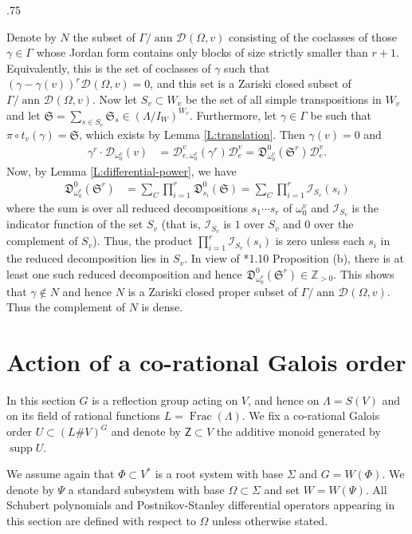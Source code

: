 \documentclass[11pt,fleqn]{amsart}
\makeatletter
\renewcommand\proofname{Proof}
\renewenvironment{proof}[1][\textit{\proofname}]{\par
 \pushQED{\qed}%
 \normalfont \topsep.75\paraskip\relax
 \trivlist
 \item[\hskip\labelsep
 \itshape
 #1\@addpunct{.}]\ignorespaces
}{%
 \popQED\endtrivlist\@endpefalse
}
\newcounter{para}[section]
\newcommand\ZZ{\mathbb Z}
\newcommand\D[3]{{}^{#1} \mathfrak D_{#2}^{#3}}
\newcommand\DD[3]{{}^{#1} \mathcal D_{#2}^{#3}}
\newcommand\Z{\mathsf Z}
\renewcommand\SS{\mathfrak S}
\DeclareMathOperator\Frac{Frac}
\DeclareMathOperator\ann{ann}
\DeclareMathOperator\supp{supp}
\makeatother
\begin{document}
\begin{proof}
Denote by $N$ the subset of $\Gamma /\ann \DD{}{}{}(\Omega, v)$ consisting of
the coclasses of those $\gamma \in \Gamma$ whose Jordan form contains only 
blocks of size strictly smaller than $r + 1$. Equivalently, 
this is the set of coclasses of $\gamma$ such that $(\gamma - 
\gamma(v))^{r} \DD{}{}{}(\Omega, v) = 0$, and this set is a 
Zariski closed subset of $\Gamma / \ann \DD{}{}{}(\Omega, v)$. Now let $S_v \subset 
W_v$ be the set of all simple transpositions in $W_v$ and let $\SS = 
\sum_{s \in S_v} \SS_s \in (\Lambda/I_W)^{W_v}$. Furthermore, let $\gamma \in \Gamma$
be such that $\pi \circ t_v(\gamma) = \SS$, which exists by Lemma 
\ref{L:translation}. Then $\gamma(v) = 0$ and
\begin{align*}
\gamma^{r} \cdot \DD{}{\omega_0^v}{}(v)
	&= \DD{}{e,\omega_0^v}{v}(\gamma^{r}) \DD{}{e}{v}
	= \D{}{\omega_0^v}{0}(\SS^{r}) \DD{}{e}{v}.
\end{align*}
Now, by Lemma \ref{L:differential-power}, we have 
\begin{align*}
\D{}{\omega_0^v}{0}(\SS^{r})
	&= \sum_{C} \prod_{i=1}^{r} \D{}{s_i}{0}(\SS)
	= \sum_{C} \prod_{i=1}^{r} \mathcal I_{S_v}(s_i)
\end{align*}
where the sum is over all reduced decompositions $s_1 \cdots s_{r}$ of 
$\omega_0^v$ and $\mathcal I_{S_v}$ is the indicator function of the set $S_v$ 
(that is, $\mathcal I_{S_v}$ is $1$ over $S_v$ and $0$ over the complement of 
$S_v$). Thus, the product $\prod_{i=1}^{r} \mathcal I_{S_v}(s_i)$ is zero 
unless each $s_i$ in the reduced decomposition lies in $S_v$. In view of 
\cite{Hump-coxeter-book}*{1.10 Proposition (b)}, there is at least one
such reduced decomposition and hence $\D{}{\omega_0^v}{0}(\SS^{r}) \in 
\ZZ_{>0}$. This shows that $\gamma \notin N$ and hence $N$ is a Zariski closed 
proper subset of $\Gamma/ \ann \DD{}{}{}(\Omega, v)$. Thus the complement of 
$N$ is dense.
\end{proof}

\section{Action of a co-rational Galois order}
In this section $G$ is a reflection group acting on $V$, and hence on 
$\Lambda = S(V)$ and on its field of rational functions $L = 
\Frac(\Lambda)$. We fix a co-rational Galois order $U \subset (L\# V)^G$ and 
denote by $\Z \subset V$ the additive monoid generated by $\supp U$. 

We assume again that $\Phi \subset V^*$ is a root system with base $\Sigma$ 
and $G = W(\Phi)$. We denote by $\Psi$ a standard subsystem with base $\Omega
\subset \Sigma$ and set $W = W(\Psi)$. All Schubert polynomials and 
Postnikov-Stanley differential operators appearing in this section are defined 
with respect to $\Omega$ unless otherwise stated.
\end{document}
